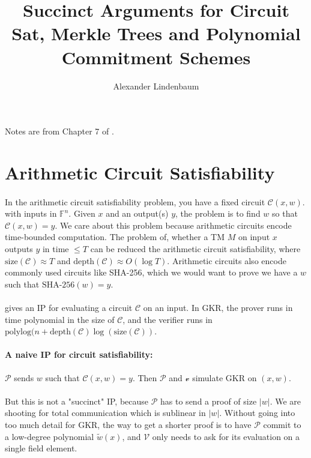 \documentclass[11pt]{article}
\title{Succinct Arguments for Circuit Sat, Merkle Trees and Polynomial Commitment Schemes}
\author{Alexander Lindenbaum}
\date{}
\newcommand{\prover}{$\mathcal{P}$ }
\newcommand{\verifier}{$\mathcal{V}$ }
\begin{document}
\maketitle

\paragraph*{} Notes are from Chapter 7 of \cite{tha22}.

\section{Arithmetic Circuit Satisfiability}

\paragraph{} In the arithmetic circuit satisfiability problem, you have a fixed circuit $\mathcal{C}(x, w)$. with inputs in $\mathbb{F}^n$. Given $x$ and an output(s) $y$, the problem is to find $w$ so that $\mathcal{C}(x, w) = y$. We care about this problem because arithmetic circuits encode time-bounded computation. The problem of, whether a TM $M$ on input $x$ outputs $y$ in time $\leq T$ can be reduced the arithmetic circuit satisfiability, where $\text{size}(\mathcal{C}) \approx T$ and $\text{depth}(\mathcal{C}) \approx O(\log T)$. Arithmetic circuits also encode commonly used circuits like SHA-256, which we would want to prove we have a $w$ such that $\text{SHA-256}(w) = y$.

\paragraph{} \cite{gkr08} gives an IP for evaluating a circuit $\mathcal{C}$ on an input. In GKR, the prover runs in time polynomial in the size of $\mathcal{C}$, and the verifier runs in $\text{polylog}(n + \text{depth}(\mathcal{C}) \log (\text{size} (\mathcal{C}))$.

\paragraph{A naive IP for circuit satisfiability:} \prover sends $w$ such that $\mathcal{C}(x, w) = y$. Then $\mathcal{P}$ and $\mathcal{v}$ simulate GKR on $(x, w)$.

\paragraph{} But this is not a "succinct" IP, because \prover has to send a proof of size $|w|$. We are shooting for total communication which is sublinear in $|w|$. Without going into too much detail for GKR, the way to get a shorter proof is to have \prover commit to a low-degree polynomial $\tilde{w}(x)$, and \verifier only needs to ask for its evaluation on a single field element.
\end{document}
